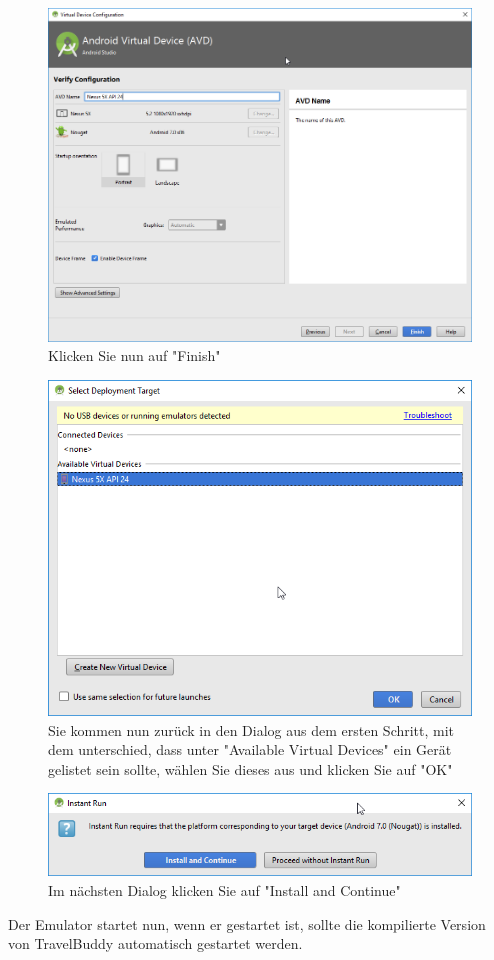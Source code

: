 \documentclass[a4paper,10pt,xetex]{article}
\begin{document}
\begin{figure}
  \centering
  \includegraphics[width=\textwidth]{Installation/3-6}
  \caption{Klicken Sie nun auf "Finish"}
\end{figure}

\begin{figure}
  \centering
  \includegraphics[width=\textwidth]{Installation/3-7}
  \caption{Sie kommen nun zurück in den Dialog aus dem ersten Schritt, mit dem unterschied, dass unter "Available Virtual Devices" ein Gerät gelistet sein sollte, wählen Sie dieses aus und klicken Sie auf "OK"}
\end{figure}

\begin{figure}
  \centering
  \includegraphics[width=\textwidth]{Installation/3-8}
  \caption{Im nächsten Dialog klicken Sie auf "Install and Continue"}
\end{figure}

Der Emulator startet nun, wenn er gestartet ist, sollte die kompilierte Version von TravelBuddy automatisch gestartet werden.
\end{document}
